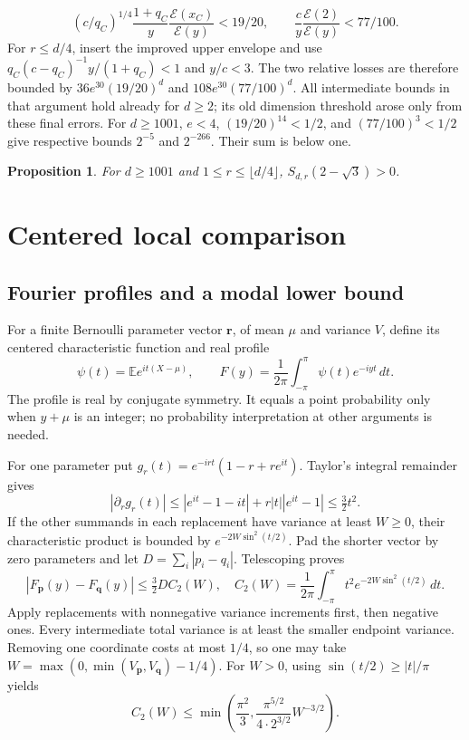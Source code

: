 \documentclass[11pt]{article}
\newtheorem{proposition}[theorem]{Proposition}
\theoremstyle{remark}\newtheorem{remark}[theorem]{Remark}
\newcommand{\E}{\mathbb E}
\newcommand{\EE}{\mathcal E}
\newcommand{\dd}{\,dt}
\newcommand{\cc}{2-\sqrt3}
\begin{document}
\[
 (c/q_C)^{1/4}\frac{1+q_C}{y}\frac{\EE(x_C)}{\EE(y)}<19/20,
 \qquad \frac cy\frac{\EE(2)}{\EE(y)}<77/100 .
\]
For $r\le d/4$, insert the improved upper envelope and use
$q_C(c-q_C)^{-1}y/(1+q_C)<1$ and $y/c<3$.
The two relative losses are therefore bounded by
$36e^{30}(19/20)^d$ and $108e^{30}(77/100)^d$.
All intermediate bounds in that argument hold already for $d\ge2$; its old
dimension threshold arose only from these final errors. For $d\ge1001$,
$e<4$, $(19/20)^{14}<1/2$, and $(77/100)^3<1/2$ give respective bounds
$2^{-5}$ and $2^{-266}$. Their sum is below one.
\begin{proposition}\label{prop:forward}
For $d\ge1001$ and $1\le r\le\lfloor d/4\rfloor$, $S_{d,r}(\cc)>0$.
\end{proposition}

\section{Centered local comparison}\label{sec:centered}
\subsection{Fourier profiles and a modal lower bound}
For a finite Bernoulli parameter vector $\boldsymbol r$, of mean $\mu$ and
variance $V$, define its centered characteristic function and real profile
\[
 \psi(t)=\E e^{it(X-\mu)},\qquad
 F(y)=\frac1{2\pi}\int_{-\pi}^{\pi}\psi(t)e^{-iyt}\dd .
\]
The profile is real by conjugate symmetry. It equals a point probability
only when $y+\mu$ is an integer; no probability interpretation at other
arguments is needed.

For one parameter put $g_r(t)=e^{-irt}(1-r+re^{it})$.
Taylor's integral remainder gives
\[
 |\partial_rg_r(t)|
 \le|e^{it}-1-it|+r|t||e^{it}-1|\le\tfrac32t^2.
\]
If the other summands in each replacement have variance at least $W\ge0$,
their characteristic product is bounded by $e^{-2W\sin^2(t/2)}$.
Pad the shorter vector by zero parameters and let
$D=\sum_i|p_i-q_i|$. Telescoping proves
\begin{equation}\label{eq:centercompare}
 |F_{\boldsymbol p}(y)-F_{\boldsymbol q}(y)|
 \le\tfrac32D C_2(W),\quad
 C_2(W)=\frac1{2\pi}\int_{-\pi}^{\pi}t^2e^{-2W\sin^2(t/2)}\dd .
\end{equation}
Apply replacements with nonnegative variance increments first, then negative
ones. Every intermediate total variance is at least the smaller endpoint
variance. Removing one coordinate costs at most $1/4$, so one may take
$W=\max(0,\min(V_{\boldsymbol p},V_{\boldsymbol q})-1/4)$.
For $W>0$, using $\sin(t/2)\ge|t|/\pi$ yields
\begin{equation}\label{eq:C2general}
 C_2(W)\le\min\left(\frac{\pi^2}{3},
       \frac{\pi^{5/2}}{4\cdot2^{3/2}}W^{-3/2}\right).
\end{equation}
\end{document}
